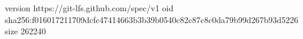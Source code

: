 version https://git-lfs.github.com/spec/v1
oid sha256:f016017211709dcfc47414663b3b39b0540c82c87c8c0da79b99d267b93d5226
size 262240
